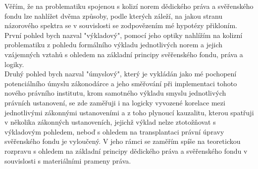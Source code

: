 \documentclass{article}
\begin{document}


Věřím, že na problematiku spojenou s kolizí norem dědického práva a svěřenského fondu lze nahlížet dvěma způsoby, podle kterých záleží, na jakou stranu názorového spektra se v souvislosti se zodpovězením mé hypotézy přikloním.\\

První pohled bych nazval "výkladový", pomocí jeho optiky nahlížím na kolizní problematiku z pohledu formálního výkladu jednotlivých norem a jejich vzájemných vztahů s ohledem na základní principy svěřenského fondu, práva a logiky.\\



Druhý pohled bych nazval "úmyslový", který je vykládán jako mé pochopení potenciálního úmyslu zákonodárce a jeho směřování při implementaci tohoto nového právního institutu, krom samotného výkladu smyslu jednotlivých právních ustanovení, se zde zaměřuji i na logicky vyvozené korelace mezi jednotlivými zákonnými ustanoveními a z toho plynoucí kauzalitu, kterou spatřuji v několika zákonných ustanoveních, jejichž výklad nelze ztotožňovat s výkladovým pohledem, neboď s ohledem na transplantaci právní úpravy svěřenského fondu je vyloučený. V jeho rámci se zaměřím spíše na teoretickou rozpravu s ohledem na základní principy dědického práva a svěřenského fondu v souvislosti s materiálními prameny práva.\\

\end{document}
